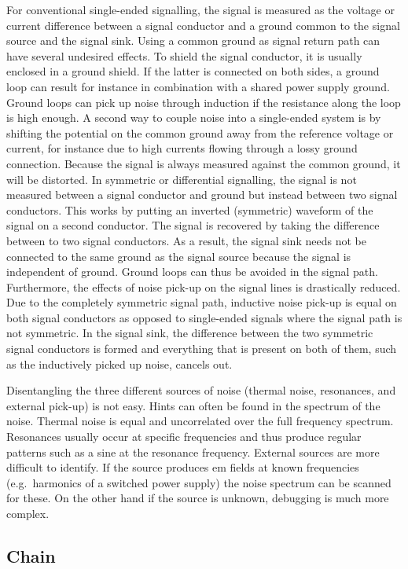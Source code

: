 For conventional single-ended signalling, the signal is measured as the voltage or current difference between a signal conductor and a ground common to the signal source and the signal sink.
Using a common ground as signal return path can have several undesired effects.
To shield the signal conductor, it is usually enclosed in a ground shield.
If the latter is connected on both sides, a ground loop can result for instance in combination with a shared power supply ground.
Ground loops can pick up noise through induction if the resistance along the loop is high enough.
A second way to couple noise into a single-ended system is by shifting the potential on the common ground away from the reference voltage or current, for instance due to high currents flowing through a lossy ground connection.
Because the signal is always measured against the common ground, it will be distorted.
In symmetric or differential signalling, the signal is not measured between a signal conductor and ground but instead between two signal conductors.
This works by putting an inverted (symmetric) waveform of the signal on a second conductor.
The signal is recovered by taking the difference between to two signal conductors.
As a result, the signal sink needs not be connected to the same ground as the signal source because the signal is independent of ground.
Ground loops can thus be avoided in the signal path.
Furthermore, the effects of noise pick-up on the signal lines is drastically reduced.
Due to the completely symmetric signal path, inductive noise pick-up is equal on both signal conductors as opposed to single-ended signals where the signal path is not symmetric.
In the signal sink, the difference between the two symmetric signal conductors is formed and everything that is present on both of them, such as the inductively picked up noise, cancels out.

Disentangling the three different sources of noise (thermal noise, resonances, and external pick-up) is not easy.
Hints can often be found in the spectrum of the noise.
Thermal noise is equal and uncorrelated over the full frequency spectrum.
Resonances usually occur at specific frequencies and thus produce regular patterns such as a sine at the resonance frequency.
External sources are more difficult to identify.
If the source produces \gls{em} fields at known frequencies (e.g.\ harmonics of a switched power supply) the noise spectrum can be scanned for these.
On the other hand if the source is unknown, debugging is much more complex.


\subsection{\AT{} Chain}
\label{sec:studies_electronics_at}

